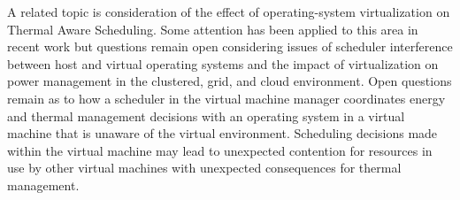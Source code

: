 A related topic is consideration of the effect of operating-system
virtualization on Thermal Aware Scheduling.  Some attention has been
applied to this area in recent work \cite{Merkel2010} but questions
remain open considering issues of scheduler interference between host
and virtual operating systems and the impact of virtualization on
power management in the clustered, grid, and cloud environment.  Open
questions remain as to how a scheduler in the virtual machine manager
coordinates energy and thermal management decisions with an operating
system in a virtual machine that is unaware of the virtual environment.
Scheduling decisions made within the virtual machine may lead to
unexpected contention for resources in use by other virtual machines
with unexpected consequences for thermal management.
